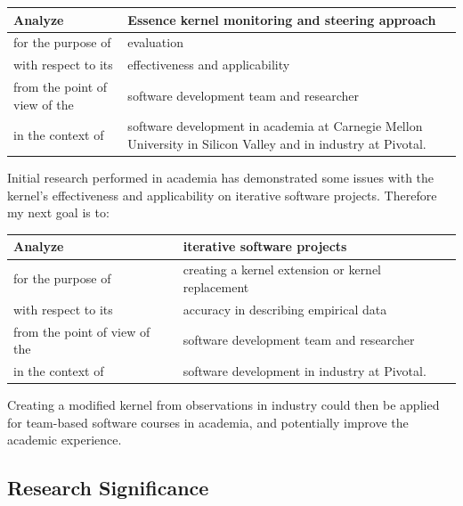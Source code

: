 \documentclass[preprint,12pt,3p]{elsarticle}
\begin{document}
\begin{table}[H]
\centering
\begin{tabular}{|p{2.00in}|p{4.10in}|}
\hline
Analyze & Essence kernel monitoring and steering approach \\ \hline
for the purpose of & evaluation \\ \hline
with respect to its & effectiveness and applicability \\ \hline
from the point of view of the & software development team and researcher \\ \hline
in the context of & software development in academia at Carnegie Mellon University in Silicon Valley and in industry at Pivotal. \\
\hline
\end{tabular}
\end{table}

Initial research performed in academia has demonstrated some issues with the kernel's effectiveness and applicability on iterative software projects. Therefore my next goal is to:

\begin{table}[H]
\centering
\begin{tabular}{|p{2.00in}|p{4.10in}|}
\hline
Analyze & iterative software projects  \\ \hline
for the purpose of & creating a kernel extension or kernel replacement  \\ \hline
with respect to its & accuracy in describing empirical data \\ \hline
from the point of view of the & software development team and researcher \\ \hline
in the context of & software development in industry at Pivotal. \\
\hline
\end{tabular}
\end{table}

Creating a modified kernel from observations in industry could then be applied for team-based software courses in academia, and potentially improve the academic experience.

\subsection{Research Significance}
\end{document}
